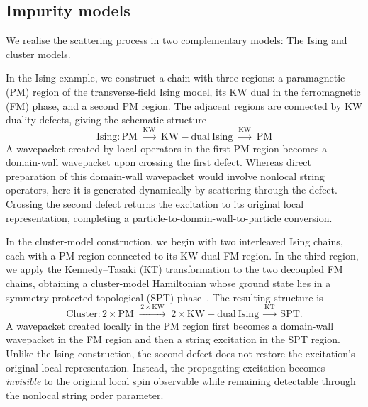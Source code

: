 \subsection{Impurity models}
We realise the scattering process in two complementary models: The Ising and cluster models. 

In the Ising example, we construct a chain with three regions: a paramagnetic (PM) region of the transverse-field Ising model, its KW dual in the ferromagnetic (FM) phase, and a second PM region. The adjacent regions are connected by KW duality defects, giving the schematic structure
$$\text{Ising:}\,\mathrm{PM} \;\xrightarrow{\mathrm{KW}}\; \mathrm{KW-dual\ Ising} \;\xrightarrow{\mathrm{KW}}\; \mathrm{PM} $$
A wavepacket created by local operators in the first PM region becomes a domain-wall wavepacket upon crossing the first defect. Whereas direct preparation of this domain-wall wavepacket would involve nonlocal string operators, here it is generated dynamically by scattering through the defect. Crossing the second defect returns the excitation to its original local representation, completing a particle-to-domain-wall-to-particle conversion.

In the cluster-model construction, we begin with two interleaved Ising chains, each with a PM region connected to its KW-dual FM region. In the third region, we apply the Kennedy–Tasaki (KT) transformation to the two decoupled FM chains, obtaining a cluster-model Hamiltonian whose ground state lies in a symmetry-protected topological (SPT) phase~\cite{else2013hidden}. The resulting structure is
$$\text{Cluster:}\,2\times\mathrm{PM} \;\xrightarrow{\,2\times\mathrm{KW}\,}\; 2\times\mathrm{KW\!-\!dual\ Ising} \;\xrightarrow{\mathrm{KT}}\; \mathrm{SPT}.$$
A wavepacket created locally in the PM region first becomes a domain-wall wavepacket in the FM region and then a string excitation in the SPT region. Unlike the Ising construction, the second defect does not restore the excitation’s original local representation. Instead, the propagating excitation becomes {\it{invisible}} to the original local spin observable while remaining detectable through the nonlocal string order parameter.

